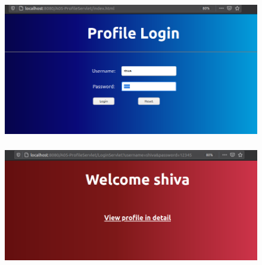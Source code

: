 \documentclass[12pt,letterpaper]{article}
\begin{document}
\subsubsection*{}
\begin{flushleft}

\end{flushleft}

\newpage
\subsection*{}
\subsubsection*{}
\begin{figure}[h]
    \centering
    \includegraphics[width = \textwidth]{Pics/op1.png}
\end{figure}
\newpage
\subsubsection*{}
\begin{figure}[h!]
    \centering
    \includegraphics[width = \textwidth]{Pics/op2.png}
\end{figure}
\end{document}
